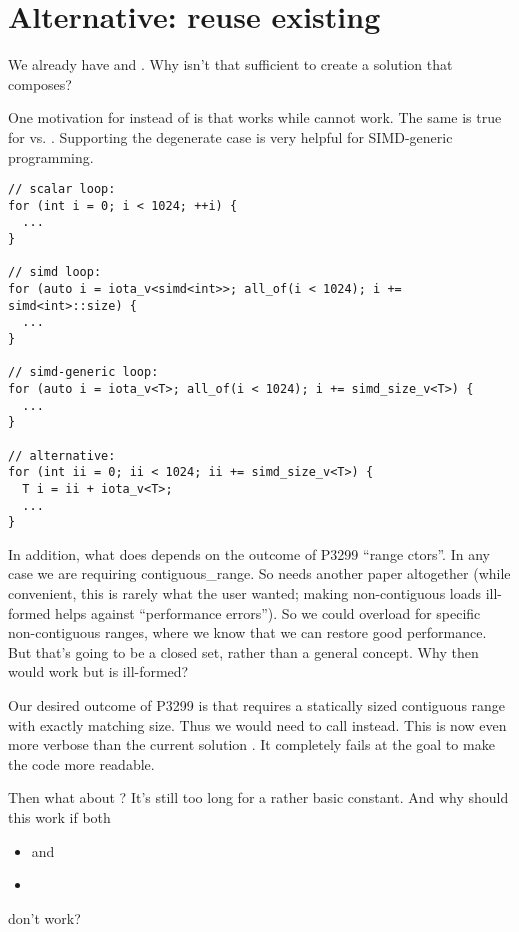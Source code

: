 \section{Alternative: reuse existing }

We already have  and .
Why isn't that sufficient to create a solution that composes?

One motivation for  instead of 
is that  works while  cannot work.
The same is true for  vs.
.
Supporting the degenerate case is very helpful for SIMD-generic programming.

\medskip\begin{lstlisting}[style=Vc]
// scalar loop:
for (int i = 0; i < 1024; ++i) {
  ...
}

// simd loop:
for (auto i = iota_v<simd<int>>; all_of(i < 1024); i += simd<int>::size) {
  ...
}

// simd-generic loop:
for (auto i = iota_v<T>; all_of(i < 1024); i += simd_size_v<T>) {
  ...
}

// alternative:
for (int ii = 0; ii < 1024; ii += simd_size_v<T>) {
  T i = ii + iota_v<T>;
  ...
}
\end{lstlisting}

In addition, what  does depends on the outcome of P3299
“range ctors”.
In any case we are requiring contiguous_range.
So  needs another paper altogether (while
  convenient, this is rarely what the user wanted; making non-contiguous loads
ill-formed helps against “performance errors”).
So we could overload for specific non-contiguous ranges, where we know that we
can restore good performance.
But that's going to be a closed set, rather than a general concept.
Why then would  work but
 is ill-formed?

Our desired outcome of P3299 is that  requires a statically
sized contiguous range with exactly matching size.
Thus we would need to call
 instead.
This is now even more verbose than the current solution .
It completely fails at the goal to make the code more readable.

Then what about ?
It's still too long for a rather basic constant.
And why should this work if both
\begin{itemize}
  \item {} and
  \item {}
\end{itemize}
don't work?

